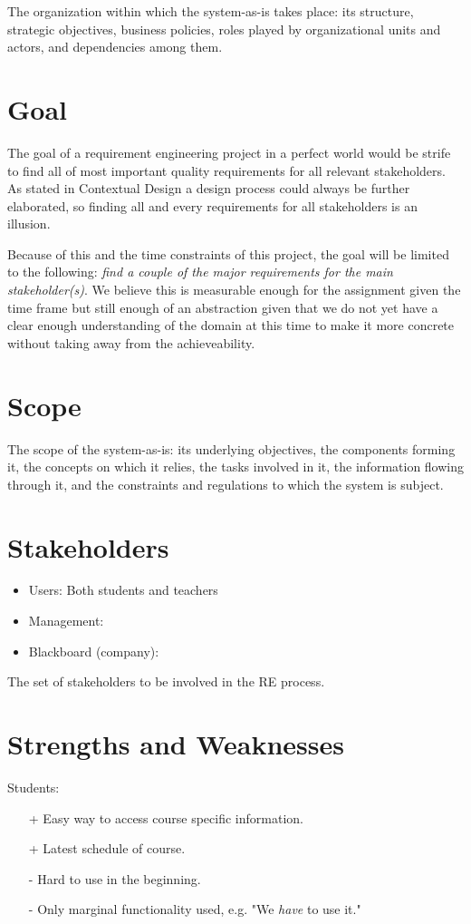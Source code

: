 The organization within which the system-as-is takes place: its structure, strategic objectives,
business policies, roles played by organizational units and actors, and dependencies
among them.

\section{Goal}
The goal of a requirement engineering project in a perfect world would be strife to find all of most important quality requirements for all relevant stakeholders. As stated in Contextual Design \cite{contextual_design} a design process could always be further elaborated, so finding all and every requirements for all stakeholders is an illusion.

Because of this and the time constraints of this project, the goal will be limited to the following: \emph{find a couple of the major requirements for the main stakeholder(s)}. We believe this is measurable enough for the assignment given the time frame but still enough of an abstraction given that we do not yet have a clear enough understanding of the domain at this time to make it more concrete without taking away from the achieveability.

\section{Scope}
The scope of the system-as-is: its underlying objectives, the components forming it, the
concepts on which it relies, the tasks involved in it, the information flowing through it,
and the constraints and regulations to which the system is subject.

\section{Stakeholders}
\begin{itemize}
	\item Users: Both students and teachers
	\item Management:
	\item Blackboard (company):
\end{itemize}

The set of stakeholders to be involved in the RE process.

\section{Strengths and Weaknesses}
Students:
\begin{itemize}
	\item[+] Easy way to access course specific information.
	\item[+] Latest schedule of course.
	\item[-] Hard to use in the beginning.
	\item[-] Only marginal functionality used, e.g. "We \textit{have} to use it."
\end{itemize}

